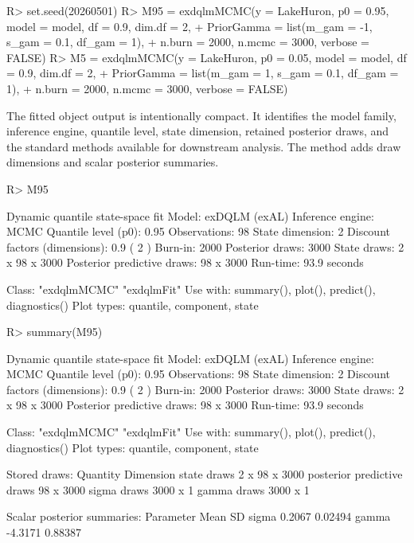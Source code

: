 \documentclass{jss}
\begin{document}
\begin{CodeChunk}
\begin{CodeInput}
R> set.seed(20260501)
R> M95 = exdqlmMCMC(y = LakeHuron, p0 = 0.95, model = model, df = 0.9, dim.df = 2,
+                 PriorGamma = list(m_gam = -1, s_gam = 0.1, df_gam = 1),
+                 n.burn = 2000, n.mcmc = 3000, verbose = FALSE)
R> M5 = exdqlmMCMC(y = LakeHuron, p0 = 0.05, model = model, df = 0.9, dim.df = 2,
+                 PriorGamma = list(m_gam = 1, s_gam = 0.1, df_gam = 1),
+                 n.burn = 2000, n.mcmc = 3000, verbose = FALSE)
\end{CodeInput}
\end{CodeChunk}

The fitted object output is intentionally compact. It identifies the model
family, inference engine, quantile level, state dimension, retained posterior
draws, and the standard methods available for downstream analysis. The
 method adds draw dimensions and scalar posterior summaries.
\begin{CodeChunk}
\begin{CodeInput}
R> M95
\end{CodeInput}
\begin{CodeOutput}
Dynamic quantile state-space fit
Model: exDQLM (exAL)
Inference engine: MCMC
Quantile level (p0): 0.95
Observations: 98
State dimension: 2
Discount factors (dimensions): 0.9 ( 2 )
Burn-in: 2000
Posterior draws: 3000
State draws: 2 x 98 x 3000
Posterior predictive draws: 98 x 3000
Run-time: 93.9 seconds

Class: "exdqlmMCMC" "exdqlmFit"
Use with: summary(), plot(), predict(), diagnostics()
Plot types: quantile, component, state
\end{CodeOutput}
\begin{CodeInput}
R> summary(M95)
\end{CodeInput}
\begin{CodeOutput}
Dynamic quantile state-space fit
Model: exDQLM (exAL)
Inference engine: MCMC
Quantile level (p0): 0.95
Observations: 98
State dimension: 2
Discount factors (dimensions): 0.9 ( 2 )
Burn-in: 2000
Posterior draws: 3000
State draws: 2 x 98 x 3000
Posterior predictive draws: 98 x 3000
Run-time: 93.9 seconds

Class: "exdqlmMCMC" "exdqlmFit"
Use with: summary(), plot(), predict(), diagnostics()
Plot types: quantile, component, state

Stored draws:
                   Quantity     Dimension
                state draws 2 x 98 x 3000
 posterior predictive draws     98 x 3000
                sigma draws      3000 x 1
                gamma draws      3000 x 1

Scalar posterior summaries:
 Parameter    Mean      SD
     sigma  0.2067 0.02494
     gamma -4.3171 0.88387
\end{CodeOutput}
\end{CodeChunk}
\end{document}
